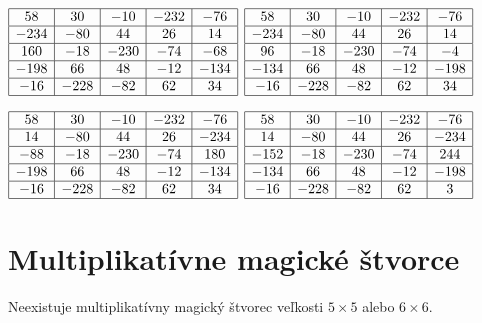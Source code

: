 \begin{center}
$\begin{array}{ |c|c|c|c|c| }
\hline
58 & 30 & -10 & -232 & -76 \\ 
\hline
-234 & -80 & 44 & 26 & 14  \\ 
\hline
160 & -18 & -230 & -74 & -68 \\ 
\hline
-198 & 66 & 48 & -12 & -134 \\ 
\hline
-16 & -228 & -82 & 62 & 34 \\ 
\hline
\end{array}$
{}
$\begin{array}{ |c|c|c|c|c| } 
\hline
58 & 30 & -10 & -232 & -76 \\ 
\hline
-234 & -80 & 44 & 26 & 14  \\ 
\hline
96 & -18 & -230 & -74 & -4 \\ 
\hline
-134 & 66 & 48 & -12 & -198 \\ 
\hline
-16 & -228 & -82 & 62 & 34 \\ 
\hline
\end{array}$
\end{center}
\begin{center}
$\begin{array}{ |c|c|c|c|c| }
\hline
58 & 30 & -10 & -232 & -76 \\ 
\hline
14 & -80 & 44 & 26 & -234 \\ 
\hline
-88 & -18 & -230 & -74 & 180 \\ 
\hline
-198 & 66 & 48 & -12 & -134 \\ 
\hline
-16 & -228 & -82 & 62 & 34 \\ 
\hline
\end{array}$
{}
$\begin{array}{ |c|c|c|c|c| } 
\hline
58 & 30 & -10 & -232 & -76 \\ 
\hline
14 & -80 & 44 & 26 & -234 \\ 
\hline
-152 & -18 & -230 & -74 & 244 \\ 
\hline
-134 & 66 & 48 & -12 & -198 \\ 
\hline
-16 & -228 & -82 & 62 & 3 \\ 
\hline
\end{array}$
\end{center}

\section{Multiplikatívne magické štvorce}

\begin{hypothesis} Neexistuje multiplikatívny magický štvorec veľkosti $5 \times 5$ alebo $6 \times 6$.
\end{hypothesis} 


